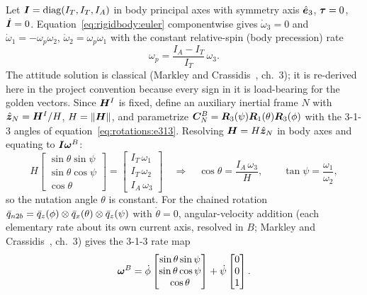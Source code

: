 Let $\bm{I} = \mathrm{diag}(I_T, I_T, I_A)$ in body principal axes with
symmetry axis $\hat{\bm{e}}_3$, $\bm{\tau} = 0$, $\dot{\bm{I}} = 0$.
Equation~\eqref{eq:rigidbody:euler} componentwise gives $\dot{\omega}_3 =
0$ and $\dot{\omega}_1 = -\omega_p \omega_2$, $\dot{\omega}_2 = \omega_p
\omega_1$ with the constant relative-spin (body precession) rate
\begin{equation}
  \omega_p = \frac{I_A - I_T}{I_T}\, \omega_3 .
  \label{eq:rigidbody:omegap}
\end{equation}
The attitude solution is classical (Markley and
Crassidis~\cite{markley2014}, ch.~3); it is re-derived here in the project
convention because every sign in it is load-bearing for the golden vectors.
Since $\bm{H}^{I}$ is fixed, define an auxiliary inertial frame $N$ with
$\hat{\bm{z}}_N = \bm{H}^{I}/H$, $H = \left\lVert \bm{H} \right\rVert$, and parametrize
$\bm{C}_{N}^{B} = \bm{R}_3(\psi)\bm{R}_1(\theta)\bm{R}_3(\phi)$ with the
3-1-3 angles of equation~\eqref{eq:rotations:e313}. Resolving $\bm{H} = H
\hat{\bm{z}}_N$ in body axes and equating to
$\bm{I}\bm{\omega}^{B}$:
\begin{equation}
  H \begin{bmatrix} \sin\theta\sin\psi \\ \sin\theta\cos\psi \\
     \cos\theta \end{bmatrix}
  = \begin{bmatrix} I_T\,\omega_1 \\ I_T\,\omega_2 \\ I_A\,\omega_3
    \end{bmatrix}
  \quad\Longrightarrow\quad
  \cos\theta = \frac{I_A\,\omega_3}{H}, \qquad
  \tan\psi = \frac{\omega_1}{\omega_2},
  \label{eq:rigidbody:coningparams}
\end{equation}
so the nutation angle $\theta$ is constant. For the chained rotation
$\bar{q}_{n2b} = \bar{q}_z(\phi) \otimes \bar{q}_x(\theta) \otimes
\bar{q}_z(\psi)$ with $\dot{\theta} = 0$, angular-velocity addition
(each elementary rate about its own current axis, resolved in $B$;
Markley and Crassidis~\cite{markley2014}, ch.~3) gives the 3-1-3 rate map
\begin{equation}
  \bm{\omega}^{B}
  = \dot{\phi}
    \begin{bmatrix} \sin\theta\sin\psi \\ \sin\theta\cos\psi \\
      \cos\theta \end{bmatrix}
    + \dot{\psi}
    \begin{bmatrix} 0 \\ 0 \\ 1 \end{bmatrix} .
  \label{eq:rigidbody:eulerrates}
\end{equation}
